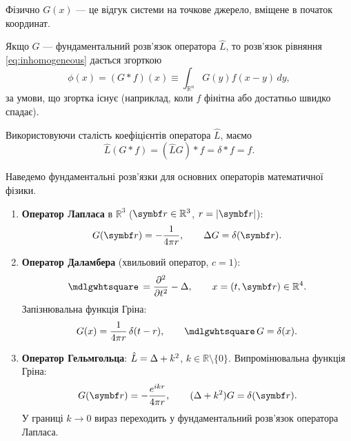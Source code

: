 Фізично $G(x)$ --- це відгук системи на точкове джерело, вміщене в початок координат.

Якщо $G$ --- фундаментальний розв'язок оператора $\hat{L}$, то розв'язок рівняння \eqref{eq:inhomogeneous} дається згорткою
\begin{equation}\label{eq:solution_via_convolution}
    \phi(x) = (G * f)(x) \equiv \int_{\mathbb{R}^n} G(y) f(x - y) \, dy,
\end{equation}
за умови, що згортка існує (наприклад, коли $f$ фінітна або достатньо швидко спадає).

Використовуючи сталість коефіцієнтів оператора $\hat{L}$, маємо
\begin{equation*}
        \hat{L} (G * f) = (\hat{L} G) * f = \delta * f = f.
\end{equation*}


\medskip
Наведемо фундаментальні розв'язки для основних операторів математичної фізики.

\begin{enumerate}
    \item \textbf{Оператор Лапласа} в $\mathbb{R}^3$ ($\vect{r} \in \mathbb{R}^3$, $r = |\vect{r}|$):
    \begin{equation}\label{eq:laplace_fundamental}
        G(\vect{r}) = -\frac{1}{4\pi r}, \qquad \Laplasian G = \delta(\vect{r}).
    \end{equation}

    \item \textbf{Оператор Даламбера} (хвильовий оператор, $c=1$):
    \[
        \Dalambertian = \frac{\partial^2}{\partial t^2} - \Laplasian, \qquad x = (t, \vect{r}) \in \mathbb{R}^4.
    \]
    Запізнювальна функція Гріна:
    \begin{equation}\label{eq:dalambert_fundamental}
        G(x) = \frac{1}{4\pi r}\,\delta(t - r), \qquad \Dalambertian G = \delta(x).
    \end{equation}

    \item \textbf{Оператор Гельмгольца}: $\hat{L} = \Delta + k^2$, $k \in \mathbb{R}\setminus\{0\}$.
    Випромінювальна функція Гріна:
    \begin{equation}\label{eq:helmholtz_fundamental}
        G(\vect{r}) = -\frac{e^{ikr}}{4\pi r}, \qquad (\Laplasian + k^2) G = \delta(\vect{r}).
    \end{equation}
    У границі $k \to 0$ вираз переходить у фундаментальний розв'язок оператора Лапласа.
\end{enumerate}


